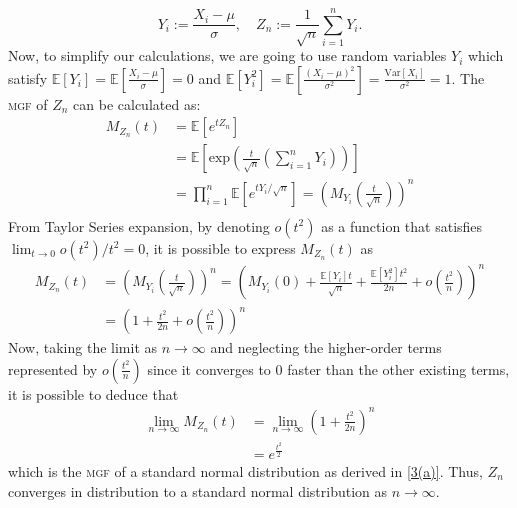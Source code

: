 \documentclass[a4paper,10pt]{article}
\begin{document}
\begin{enumerate}
\begin{enumerate}[(a)]
	\begin{equation*}
		Y_i:=\frac{X_i-\mu}{\sigma},\quad Z_n:=\frac{1}{\sqrt{n}}\sum_{i=1}^{n} Y_i.
	\end{equation*}
	Now, to simplify our calculations, we are going to use random variables $Y_i$ which satisfy $\mathbb{E}\!\left[Y_i\right] = \mathbb{E}\!\left[\frac{X_i-\mu}{\sigma}\right] = 0$ and $\mathbb{E}\!\left[Y_i^2\right]=\mathbb{E}\!\left[\frac{\left(X_i-\mu\right)^2}{\sigma^2}\right]=\frac{\mathrm{Var}\left[X_i\right]}{\sigma^2}=1$. The \textsc{mgf} of $Z_n$ can be calculated as:
	\begin{equation*}
		\begin{aligned}
			M_{Z_n}(t) &= \mathbb{E}\!\left[e^{tZ_n}\!\right] \\
			&= \mathbb{E}\!\left[\mathrm{exp}\!\left(\frac{t}{\sqrt{n}}\left(\sum_{i=1}^{n}Y_i\right)\right)\!\right] \\
			&= \prod_{i=1}^{n} \mathbb{E}\!\left[e^{tY_i/\sqrt{n}}\right] = \left(M_{Y_i}\left(\frac{t}{\sqrt{n}}\right)\right)^n \\
		\end{aligned}
	\end{equation*}
	From Taylor Series expansion, by denoting $o(t^2)$ as a function that satisfies $\displaystyle \lim_{t \to 0} o(t^2)/t^2 = 0$, it is possible to express $M_{Z_n}(t)$ as
	\begin{equation*}
		\begin{aligned}
			M_{Z_n}(t) &= \left(M_{Y_i}\left(\frac{t}{\sqrt{n}}\right)\right)^n = \left(M_{Y_i}(0)+\frac{\mathbb{E}\!\left[Y_i\right]t}{\sqrt{n}}+\frac{\mathbb{E}\!\left[Y_i^2\right]t^2}{2n}+o\left(\frac{t^2}{n}\right)\right)^n \\
			&= \left(1+\frac{t^2}{2n}+o\left(\frac{t^2}{n}\right)\right)^n
		\end{aligned}
	\end{equation*}
	Now, taking the limit as $n \to \infty$ and neglecting the higher-order terms represented by $o(\frac{t^2}{n})$ since it converges to $0$ faster than the other existing terms, it is possible to deduce that
	\begin{equation*}
		\begin{aligned}
			\lim_{n \to \infty} M_{Z_n}(t) &= \lim_{n \to \infty} \left(1+\frac{t^2}{2n}\right)^n \\
			&= e^{\frac{t^2}{2}} 
		\end{aligned}
	\end{equation*}
	which is the \textsc{mgf} of a standard normal distribution as derived in \ref{3(a)}. Thus, $Z_n$ converges in distribution to a standard normal distribution as $n \to \infty$. \qedsymbol

\end{enumerate}
\end{enumerate}
\end{document}
